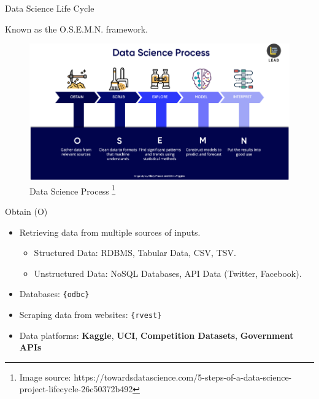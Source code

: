 \documentclass[12pt,ignorenonframetext,]{beamer}
\providecommand{\tightlist}{%
  \setlength{\itemsep}{0pt}\setlength{\parskip}{0pt}}
\begin{document}
\begin{frame}{Data Science Life Cycle}
\protect\hypertarget{data-science-life-cycle}{}

Known as the O.S.E.M.N. framework.

\begin{figure}
  \includegraphics[width=.8\textwidth,height=.8\textheight,keepaspectratio]{images/osemn.png}
  \caption{Data Science Process%
    \footnote{%
     \tiny{Image source: https://towardsdatascience.com/5-steps-of-a-data-science-project-lifecycle-26c50372b492} 
    }%
  }
\end{figure}

\end{frame}

\begin{frame}{Obtain (O)}
\protect\hypertarget{obtain-o}{}

\begin{itemize}
\tightlist
\item
  Retrieving data from multiple sources of inputs.\\

  \begin{itemize}
      \item Structured Data: RDBMS, Tabular Data, CSV, TSV.
      \item Unstructured Data: NoSQL Databases, API Data (Twitter, Facebook).
  \end{itemize}
   \vspace{2mm}
\item
  Databases: \texttt{\{odbc\}} \vspace{2mm}
\item
  Scraping data from websites: \texttt{\{rvest\}} \vspace{2mm}
\item
  Data platforms: \textbf{Kaggle}, \textbf{UCI}, \textbf{Competition
  Datasets}, \textbf{Government APIs}
\end{itemize}

\end{frame}
\end{document}

